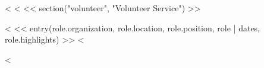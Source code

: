<%
<%
<< section("volunteer", "Volunteer Service") >>
\begin{description}
<%
<< entry(role.organization, role.location, role.position, role | dates, role.highlights) >>
<%
\end{description}

<%
